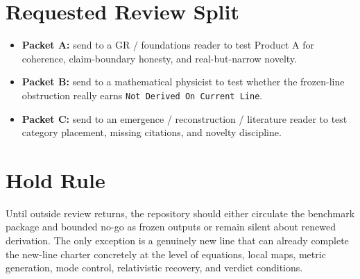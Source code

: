 \documentclass[11pt]{article}
\begin{document}
\section*{Requested Review Split}
\begin{itemize}
    \item \textbf{Packet A:} send to a GR / foundations reader to test Product A for coherence, claim-boundary honesty, and real-but-narrow novelty.
    \item \textbf{Packet B:} send to a mathematical physicist to test whether the frozen-line obstruction really earns \texttt{Not Derived On Current Line}.
    \item \textbf{Packet C:} send to an emergence / reconstruction / literature reader to test category placement, missing citations, and novelty discipline.
\end{itemize}

\section*{Hold Rule}
Until outside review returns, the repository should either circulate the benchmark package and bounded no-go as frozen outputs or remain silent about renewed derivation. The only exception is a genuinely new line that can already complete the new-line charter concretely at the level of equations, local maps, metric generation, mode control, relativistic recovery, and verdict conditions.
\end{document}
